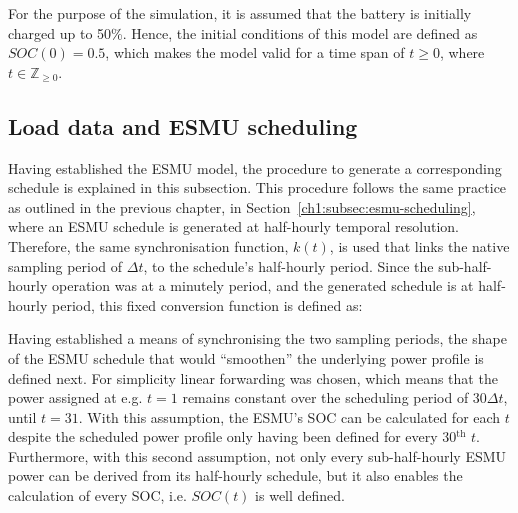 For the purpose of the simulation, it is assumed that the battery is initially charged up to 50\%.
Hence, the initial conditions of this model are defined as $SOC(0) = 0.5$, which makes the model valid for a time span of $t \geq 0$, where $t \in \mathbb{Z}_{\geq0}$.

\subsection{Load data and ESMU scheduling}
\label{ch2:subsec:load-data-and-esmu-scheduling}


Having established the ESMU model, the procedure to generate a corresponding schedule is explained in this subsection.
This procedure follows the same practice as outlined in the previous chapter, in Section~\ref{ch1:subsec:esmu-scheduling}, where an ESMU schedule is generated at half-hourly temporal resolution.
Therefore, the same synchronisation function, $k(t)$, is used that links the native sampling period of $\Delta t$, to the schedule's half-hourly period.
Since the sub-half-hourly operation was at a minutely period, and the generated schedule is at half-hourly period, this fixed conversion function is defined as:



Having established a means of synchronising the two sampling periods, the shape of the ESMU schedule that would ``smoothen'' the underlying power profile is defined next.
For simplicity linear forwarding was chosen, which means that the power assigned at e.g. $t=1$ remains constant over the scheduling period of $30\Delta t$, until $t=31$.
With this assumption, the ESMU's SOC can be calculated for each $t$ despite the scheduled power profile only having been defined for every 30$^\text{th}$ $t$.
Furthermore, with this second assumption, not only every sub-half-hourly ESMU power can be derived from its half-hourly schedule, but it also enables the calculation of every SOC, i.e. $SOC(t)$ is well defined.


